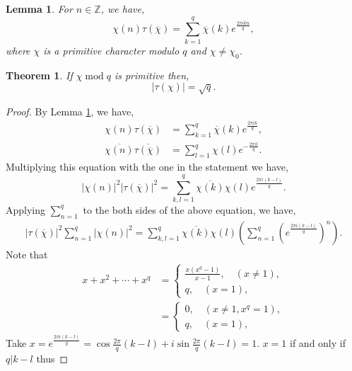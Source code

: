 \documentclass{article}
\newtheorem{theorem}{Theorem} [section]
\newtheorem{lemma}{Lemma}[section]
\DeclareMathOperator{\tmod}{mod}
\newcommand{\Z}[0]{\mathbb{Z}}
\begin{document}
\begin{lemma}
  For $n\in \Z$, we have,
  \begin{equation*}
    \chi(n)\tau(\overline{\chi}) = \sum_{k=1}^q \overline{\chi}(k)e^{{\frac {2\pi i kn} q}},
  \end{equation*}
  where $\chi$ is a primitive character modulo $q$ and $\chi\not=\chi_0$. 
  \label{lemma_gauss_sum_character}
\end{lemma}
\begin{theorem}
  If $\chi\tmod q$ is primitive then,
  \begin{equation*}
    \vert\tau(\chi)\vert = \sqrt{q}.
  \end{equation*}
  \label{theorem_gauss_sum_primitive}
\end{theorem}
\begin{proof}
By Lemma \ref{lemma_gauss_sum_character}, we have,
  \begin{align*}
    \chi(n)\tau(\overline{\chi}) &= \sum_{k=1}^q \overline{\chi}(k)e^{{\frac {2\pi i k} q}},\\
    \overline{\chi(n)}\overline{\tau(\overline{\chi})} &= \sum_{l=1}^q\chi(l)e^{-{\frac {2\pi i l} q}}.
  \end{align*}
  Multiplying this equation with the one in the statement we have,
  \begin{equation*}
    \vert \chi(n)\vert^2\vert \tau(\overline{\chi})\vert^2 = \sum_{k,l=1}^q \overline{\chi(k)}\chi(l)e^{{\frac {2\pi i (k-l)} q}}.
  \end{equation*}
  Applying $\sum_{n=1}^q$ to the both sides of the above equation, we have,
  \begin{align*}
    \vert\tau(\overline{\chi})\vert^2\sum_{n=1}^q\vert\chi(n)\vert^2 = \sum_{k,l=1}^q\overline{\chi(k)}\chi(l)\left(\sum_{n=1}^q\left(e^{{\frac {2\pi i(k-l)} q}}\right)^n\right).
  \end{align*}
  Note that 
  \begin{align*}
    x+x^2+\cdots+x^q &= \begin{cases}
      {\frac {x(x^q-1)} {x-1}},\quad(x\not =1),\\
      q,\quad(x=1),
    \end{cases}\\
    & = \begin{cases}
      0,\quad(x\not =1, x^q = 1),\\
      q,\quad(x=1),
    \end{cases}
  \end{align*}
  Take $x = e^{{\frac {2\pi i (k-l)} q}} = \cos{\frac {2\pi} q}(k-l)+i\sin{\frac {2\pi} q}(k-l)=1$. $x=1$ if and only if $q|k-l$ thus 

\end{proof}
\end{document}
